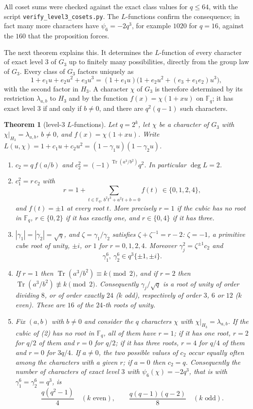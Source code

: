 \documentclass[11pt,a4paper]{amsart}
\newtheorem{theorem}{Theorem}[section]
\theoremstyle{definition}
\theoremstyle{remark}
\newcommand{\F}{\mathbb{F}}
\newcommand{\Tr}{\operatorname{Tr}}
\begin{document}
All coset sums were checked against the exact class values for $q\le64$, with the script
\texttt{verify\_level3\_cosets.py}. The
$L$-functions confirm the consequence; in fact many more characters have $\psi_6=-2q^3$, for example $1020$ for
$q=16$, against the $160$ that the proposition forces.

The next theorem explains this. It determines the $L$-function of every character of exact level $3$ of $G_3$ up to
finitely many possibilities, directly from the group law of $G_3$. Every class of $G_3$ factors uniquely as
\[
1+e_1u+e_2u^2+e_3u^3=(1+e_1u)\bigl(1+e_2u^2+(e_3+e_1e_2)u^3\bigr),
\]
with the second factor in $H_3$. A character $\chi$ of $G_3$ is therefore determined by its restriction
$\lambda_{a,b}$ to $H_3$ and by the function $f(x)=\chi(1+xu)$ on $\F_q$; it has exact level $3$ if and only if
$b\ne0$, and there are $q^2(q-1)$ such characters.

\begin{theorem}[level-$3$ $L$-functions]\label{thm:level3}
Let $q=2^k$, let $\chi$ be a character of $G_3$ with $\chi|_{H_3}=\lambda_{a,b}$, $b\ne0$, and $f(x)=\chi(1+xu)$. Write
$L(u,\chi)=1+c_1u+c_2u^2=(1-\gamma_1u)(1-\gamma_2u)$.
\begin{enumerate}
\item $c_2=q\,f(a/b)$ and $c_2^2=(-1)^{\Tr(a^3/b^2)}q^2$. In particular $\deg L=2$.
\item $c_1^2=r\,c_2$ with
\[
r=1+\sum_{t\in\F_q,\ b^2t^3+a^2t+b=0}f(t)\ \in\{0,1,2,4\},
\]
and $f(t)=\pm1$ at every root $t$. More precisely $r=1$ if the cubic has no root in $\F_q$, $r\in\{0,2\}$ if it has
exactly one, and $r\in\{0,4\}$ if it has three.
\item $|\gamma_1|=|\gamma_2|=\sqrt q$, and $\zeta=\gamma_1/\gamma_2$ satisfies $\zeta+\zeta^{-1}=r-2$: $\zeta=-1$, a
primitive cube root of unity, $\pm i$, or $1$ for $r=0,1,2,4$. Moreover $\gamma_j^2=\zeta^{\pm1}c_2$ and
\[
\gamma_1^6,\ \gamma_2^6\in q^3\{\pm1,\pm i\}.
\]
\item If $r=1$ then $\Tr(a^3/b^2)\equiv k\pmod2$, and if $r=2$ then $\Tr(a^3/b^2)\not\equiv k\pmod2$. Consequently
$\gamma_j/\sqrt q$ is a root of unity of order dividing $8$, or of order exactly $24$ \textup{(}$k$ odd\textup{)},
respectively of order $3$, $6$ or $12$ \textup{(}$k$ even\textup{)}. These are $16$ of the $24$-th roots of unity.
\item Fix $(a,b)$ with $b\ne0$ and consider the $q$ characters $\chi$ with $\chi|_{H_3}=\lambda_{a,b}$. If the cubic
of \textup{(2)} has no root in $\F_q$, all of them have $r=1$; if it has one root, $r=2$ for $q/2$ of them and $r=0$
for $q/2$; if it has three roots, $r=4$ for $q/4$ of them and $r=0$ for $3q/4$. If $a\ne0$, the two possible values
of $c_2$ occur equally often among the characters with a given $r$; if $a=0$ then $c_2=q$. Consequently the number
of characters of exact level $3$ with $\psi_6(\chi)=-2q^3$, that is with $\gamma_1^6=\gamma_2^6=q^3$, is
\[
\frac{q(q^2-1)}4\quad(k\text{ even}),\qquad \frac{q(q-1)(q-2)}8\quad(k\text{ odd}).
\]
\end{enumerate}
\end{theorem}
\end{document}
